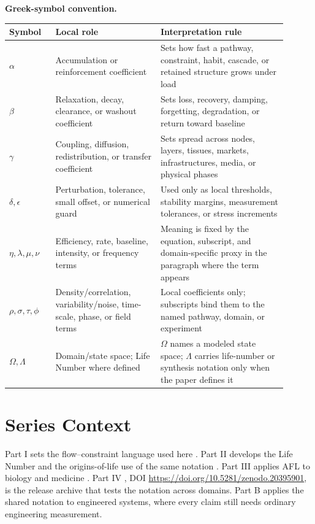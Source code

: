 \documentclass[12pt,a4paper]{article}
\begin{document}
\noindent\textbf{Greek-symbol convention.}
\begin{center}
{\small
\begin{tabular}{p{0.15\linewidth}p{0.34\linewidth}p{0.41\linewidth}}
\hline
Symbol & Local role & Interpretation rule \\
\hline
$\alpha$ & Accumulation or reinforcement coefficient & Sets how fast a pathway, constraint, habit, cascade, or retained structure grows under load \\
$\beta$ & Relaxation, decay, clearance, or washout coefficient & Sets loss, recovery, damping, forgetting, degradation, or return toward baseline \\
$\gamma$ & Coupling, diffusion, redistribution, or transfer coefficient & Sets spread across nodes, layers, tissues, markets, infrastructures, media, or physical phases \\
$\delta,\epsilon$ & Perturbation, tolerance, small offset, or numerical guard & Used only as local thresholds, stability margins, measurement tolerances, or stress increments \\
$\eta,\lambda,\mu,\nu$ & Efficiency, rate, baseline, intensity, or frequency terms & Meaning is fixed by the equation, subscript, and domain-specific proxy in the paragraph where the term appears \\
$\rho,\sigma,\tau,\phi$ & Density/correlation, variability/noise, time-scale, phase, or field terms & Local coefficients only; subscripts bind them to the named pathway, domain, or experiment \\
$\Omega,\Lambda$ & Domain/state space; Life Number where defined & $\Omega$ names a modeled state space; $\Lambda$ carries life-number or synthesis notation only when the paper defines it \\
\hline
\end{tabular}
}
\end{center}

\section{Series Context}

Part I sets the flow--constraint language used here \cite{MujjabiPartI2026}.
Part II develops the Life Number and the origins-of-life use of the same notation
\cite{MujjabiPartII2026}. Part III applies AFL to biology and medicine
\cite{MujjabiPartIII2026}. Part IV \cite{MujjabiPartIV2026}, DOI \url{https://doi.org/10.5281/zenodo.20395901}, is the release
archive that tests the notation across domains. Part B applies the shared
notation to engineered systems, where every claim still needs ordinary
engineering measurement.
\end{document}
